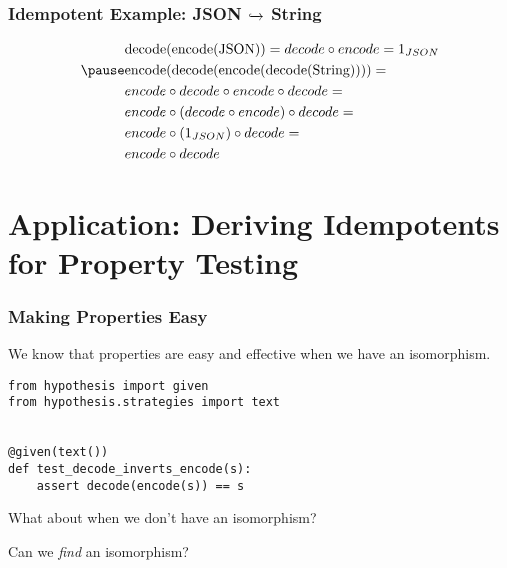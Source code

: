 \documentclass{beamer}
\begin{document}
\begin{frame}[fragile]
\frametitle{Idempotent Example: JSON {$\xhookrightarrow{}$} String}
\medskip
\begin{equation*}
\begin{aligned}
& \text{decode(encode(JSON))} = decode \circ encode = 1_{JSON} \\ \pause
& \text{encode(decode(encode(decode(String))))} = \\
& encode \circ decode \circ encode \circ decode = \\
& encode \circ (decode \circ encode) \circ decode = \\
& encode \circ (1_{JSON}) \circ decode = \\
& encode \circ decode \\
\end{aligned}
\end{equation*}
\end{frame}

\section{Application: Deriving Idempotents for Property Testing}

\begin{frame}[fragile]
\frametitle{Making Properties Easy}

We know that properties are easy and effective when we have 
an isomorphism. \\
\medskip

\begin{verbatim}
from hypothesis import given
from hypothesis.strategies import text


@given(text())
def test_decode_inverts_encode(s):
    assert decode(encode(s)) == s 
\end{verbatim}

\pause
\medskip
What about when we don't have an isomorphism? \\
\pause
\medskip

Can we \emph{find} an isomorphism?

\end{frame}
\end{document}
